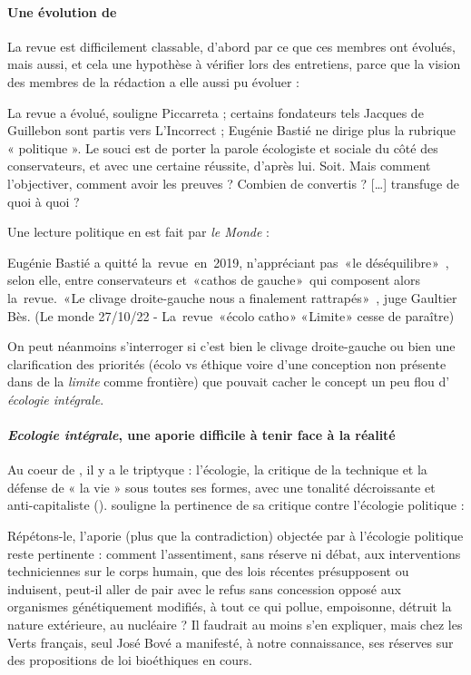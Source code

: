 \paragraph{Une évolution de \RLimite } La revue est difficilement classable, d'abord par ce que ces membres ont évolués, mais aussi, et cela une hypothèse à vérifier lors des entretiens, parce que la vision des membres de la rédaction a elle aussi pu évoluer : 
\begin{singlequote}
   La revue a évolué, souligne Piccarreta ; certains fondateurs
tels Jacques de Guillebon sont partis vers L’Incorrect ; Eugénie Bastié ne dirige plus la rubrique « politique ». Le souci est de porter la parole écologiste et sociale du côté des conservateurs, et
avec une certaine réussite, d’après lui. Soit. Mais comment l’objectiver, comment avoir les preuves ? Combien de convertis ? [\ldots] transfuge de quoi à quoi ?  \cite{flipo_limite_2019}
\end{singlequote}
Une lecture politique en est fait par \textit{le Monde} :
\begin{singlequote}
    Eugénie Bastié a quitté la revue en 2019, n’appréciant pas « le déséquilibre » , selon elle, entre conservateurs et « cathos de gauche » qui composent alors la revue. « Le clivage droite-gauche nous a finalement rattrapés » , juge Gaultier Bès. (Le monde 27/10/22 - La revue « écolo catho » « Limite » cesse de paraître)
\end{singlequote}
On peut néanmoins s'interroger si c'est bien le clivage droite-gauche ou bien une clarification des priorités (écolo vs éthique voire d'une conception non présente dans \LS de la \textit{limite} comme frontière) que pouvait cacher le concept un peu flou d' \textit{écologie intégrale}. 

\paragraph{\textit{Ecologie intégrale}, une aporie difficile à tenir face à la réalité} Au coeur de \RLimite, il y a le triptyque  : l’écologie, la critique de la technique et la défense de « la vie » sous toutes ses formes, avec une tonalité décroissante et  anti-capitaliste (\cite{flipo_limite_2019}). 
\cite{Schlegel_2018_Limite} souligne la pertinence de sa critique contre l'écologie politique  : 
\begin{singlequote}
     Répétons-le, l’aporie (plus que la contradiction) objectée par \RLimite à l’écologie politique reste pertinente : comment l’assentiment, sans réserve ni débat, aux interventions techniciennes sur le corps humain, que des lois récentes présupposent ou induisent, peut-il aller de pair avec le refus sans concession opposé aux organismes génétiquement modifiés, à tout ce qui pollue, empoisonne, détruit la nature extérieure, au nucléaire ? Il faudrait au moins s’en expliquer, mais chez les Verts français, seul José Bové a manifesté, à notre connaissance, ses réserves sur des propositions de loi bioéthiques en cours. \cite{Schlegel_2018_Limite}
 \end{singlequote}

